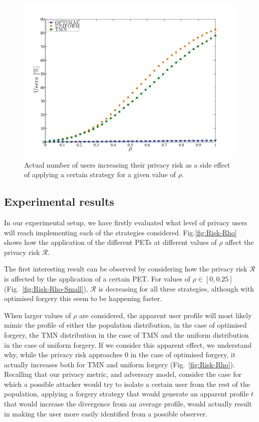 \begin{figure}[htb]  
\includegraphics[width=\textwidth]{figures/Fig7.pdf}
\caption[Increased privacy risk.]{Actual number of users increasing their privacy risk as a side effect of applying a certain strategy for a given value of $\rho$.
\label{fig:RhoIncr}}
\end{figure}

\subsection{Experimental results}
In our experimental setup, we have firstly evaluated what level of privacy users will reach implementing each of the strategies considered. Fig.\ref{fig:Risk-Rho} shows how the application of the different PETs at different values of $\rho$ affect the privacy risk $\mathcal{R}$.

The first interesting result can be observed by considering how the privacy risk $\mathcal{R}$ is affected by the application of a certain PET. For values of $ \rho \in [0,0.25]$ (Fig.~\ref{fig:Risk-Rho-Small}), $\mathcal{R}$ is decreasing for all three strategies, although with optimised forgery this seem to be happening faster.

When larger values of $\rho$ are considered, the apparent user profile will most likely mimic the profile of either the population distribution, in the case of optimised forgery, the TMN distribution in the case of TMN and the uniform distribution in the case of uniform forgery.
If we consider this apparent effect, we understand why, while the privacy risk approaches 0 in the case of optimised forgery, it actually increases both for TMN and uniform forgery (Fig.~\ref{fig:Risk-Rho}). Recalling that our privacy metric, and adversary model, consider the case for which a possible attacker would try to isolate a certain user from the rest of the population, applying a forgery strategy that would generate an apparent profile $t$ that would increase the divergence from an average profile, would actually result in making the user more easily identified from a possible observer.

